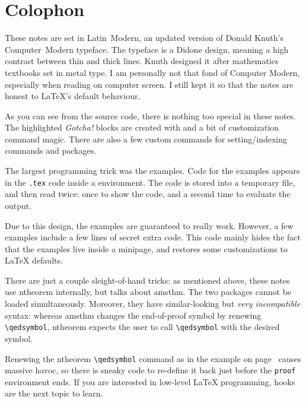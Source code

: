 \chapter*{Colophon}

These notes are set in Latin~Modern,
an updated version of Donald Knuth's Computer~Modern typeface.
The typeface is a Didone design, meaning a high contrast between thin and thick lines.
Knuth designed it after mathematics textbooks set in metal type.
I am personally not that fond of Computer Modern,
especially when reading on computer screen.
I still kept it so that the notes are honest to \LaTeX's default behaviour.

As you can see from the source code,
there is nothing too special in these notes.
The highlighted \emph{Gotcha!} blocks are created with 
and a bit of customization command magic.
There are also a few custom commands for setting/indexing commands and packages.

The largest programming trick was the examples.
Code for the examples appears in the \verb|.tex| code inside a  environment.
The code is stored into a temporary file, and then read twice:
once to show the code, and a second time to evaluate the output.

Due to this design, the examples are guaranteed to really work.
However, a few examples include a few lines of secret extra code.
This code mainly hides the fact that the examples live inside a minipage,
and restores some customizations to \LaTeX{} defaults.

There are just a couple sleight-of-hand tricks:
as mentioned above, these notes use \textsf{ntheorem} internally,
but  talks about \textsf{amsthm}.
The two packages cannot be loaded simultaneously.
Moreover, they have similar-looking but \emph{very incompatible} syntax:
whereas \textsf{amsthm} changes the end-of-proof symbol by renewing \verb|\qedsymbol|,
\textsf{ntheorem} expects the user to call \verb|\qedsymbol| with the desired symbol.

Renewing the \textsf{ntheorem} \verb|\qedsymbol| command as in
the example on page~\pageref{ex:nasty qed hack} causes massive havoc,
so there is sneaky code to re-define it back just before the \verb|proof| environment ends.
If you are interested in low-level \LaTeX{} programming,
hooks are the next topic to learn.
